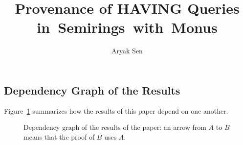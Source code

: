 \documentclass[a4paper,USenglish,anonymous]{lipics-v2021}
\title{Provenance of HAVING Queries in~Semirings~with~Monus}
\author{Aryak Sen}{TODO Affiliation, todo}{TODO}{}{}
\begin{document}
\maketitle



















\begin{toappendix}
  \section{Dependency Graph of the Results}
  \label{sec:proofgraph}

  Figure~\ref{fig:proofgraph} summarizes how the results of this paper depend
  on one another.

  \begin{figure}[htbp]
    \centering
    \proofgraph[width=\linewidth]
    \caption{Dependency graph of the results of the paper: an arrow from $A$
    to $B$ means that the proof of $B$ uses $A$.}
    \label{fig:proofgraph}
  \end{figure}
\end{toappendix}

\clearpage

\end{document}
